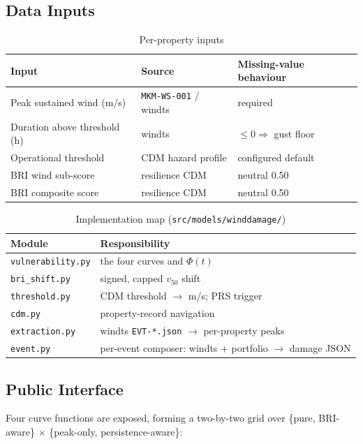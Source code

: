 \documentclass[11pt,a4paper]{article}
\begin{document}
\subsection{Data Inputs}

\begin{table}[H]
  \centering
  \caption{Per-property inputs}
  \begin{tabular}{lll}
    \toprule
    \textbf{Input} & \textbf{Source} & \textbf{Missing-value behaviour} \\
    \midrule
    Peak sustained wind (m/s) & \texttt{MKM-WS-001} / windts & required \\
    Duration above threshold (h) & windts & $\le 0 \Rightarrow$ gust floor \\
    Operational threshold & CDM hazard profile & configured default \\
    BRI wind sub-score & resilience CDM & neutral 0.50 \\
    BRI composite score & resilience CDM & neutral 0.50 \\
    \bottomrule
  \end{tabular}
\end{table}

\mkmimplementation

\begin{table}[H]
  \centering
  \caption{Implementation map (\texttt{src/models/winddamage/})}
  \begin{tabular}{ll}
    \toprule
    \textbf{Module} & \textbf{Responsibility} \\
    \midrule
    \texttt{vulnerability.py} & the four curves and $\Phi(t)$ \\
    \texttt{bri\_shift.py} & signed, capped $v_{50}$ shift \\
    \texttt{threshold.py} & CDM threshold $\to$ m/s; PRS trigger \\
    \texttt{cdm.py} & property-record navigation \\
    \texttt{extraction.py} & windts \texttt{EVT-*.json} $\to$ per-property peaks \\
    \texttt{event.py} & per-event composer: windts + portfolio $\to$ damage JSON \\
    \bottomrule
  \end{tabular}
\end{table}

\subsection{Public Interface}
Four curve functions are exposed, forming a two-by-two grid over
\{pure, BRI-aware\} $\times$ \{peak-only, persistence-aware\}:
\end{document}
